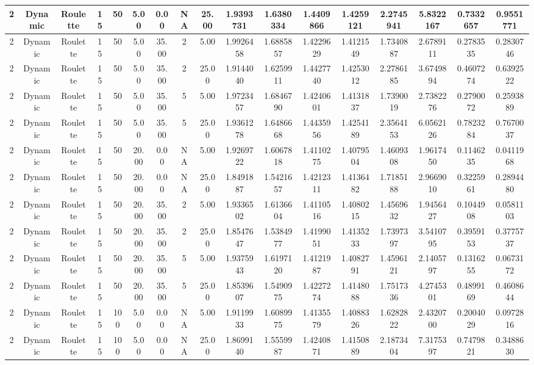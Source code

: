 \begin{longtable}{ | c | c | c | c | c | c | c | c | c | c | c | c | c | c | c | c | c | }
	\hline
	2	&	Dynamic	&	Roulette	&	15	&	50	&	5.00	&	0.00	&	NA	&	25.00	&	1.9393731	&	1.6380334	&	1.4409866	&	1.4259121	&	2.2745941	&	5.8322167	&	0.7332657	&	0.9551771 \\
	\hline
	2	&	Dynamic	&	Roulette	&	15	&	50	&	5.00	&	35.00	&	2	&	5.00	&	1.9926458	&	1.6885857	&	1.4229629	&	1.4121549	&	1.7340887	&	2.6789111	&	0.2783535	&	0.2830746 \\
	\hline
	2	&	Dynamic	&	Roulette	&	15	&	50	&	5.00	&	35.00	&	2	&	25.00	&	1.9144040	&	1.6259911	&	1.4427740	&	1.4253012	&	2.2786185	&	3.6749894	&	0.4607274	&	0.6392522 \\
	\hline
	2	&	Dynamic	&	Roulette	&	15	&	50	&	5.00	&	35.00	&	5	&	5.00	&	1.9723457	&	1.6846790	&	1.4240601	&	1.4131837	&	1.7390019	&	2.7382276	&	0.2790072	&	0.2593889 \\
	\hline
	2	&	Dynamic	&	Roulette	&	15	&	50	&	5.00	&	35.00	&	5	&	25.00	&	1.9361278	&	1.6486668	&	1.4435956	&	1.4254189	&	2.3564153	&	6.0562126	&	0.7823284	&	0.7670037 \\
	\hline
	2	&	Dynamic	&	Roulette	&	15	&	50	&	20.00	&	0.00	&	NA	&	5.00	&	1.9269722	&	1.6067818	&	1.4110275	&	1.4079504	&	1.4609308	&	1.9617450	&	0.1146235	&	0.0411968 \\
	\hline
	2	&	Dynamic	&	Roulette	&	15	&	50	&	20.00	&	0.00	&	NA	&	25.00	&	1.8491887	&	1.5421657	&	1.4212311	&	1.4136482	&	1.7185188	&	2.9669010	&	0.3225961	&	0.2894480 \\
	\hline
	2	&	Dynamic	&	Roulette	&	15	&	50	&	20.00	&	35.00	&	2	&	5.00	&	1.9336502	&	1.6136604	&	1.4110516	&	1.4080215	&	1.4569632	&	1.9456427	&	0.1044908	&	0.0581103 \\
	\hline
	2	&	Dynamic	&	Roulette	&	15	&	50	&	20.00	&	35.00	&	2	&	25.00	&	1.8547647	&	1.5384977	&	1.4199051	&	1.4135233	&	1.7397397	&	3.5410795	&	0.3959153	&	0.3775737 \\
	\hline
	2	&	Dynamic	&	Roulette	&	15	&	50	&	20.00	&	35.00	&	5	&	5.00	&	1.9375943	&	1.6197120	&	1.4121987	&	1.4082791	&	1.4596121	&	2.1405797	&	0.1316255	&	0.0673172 \\
	\hline
	2	&	Dynamic	&	Roulette	&	15	&	50	&	20.00	&	35.00	&	5	&	25.00	&	1.8539607	&	1.5490975	&	1.4227274	&	1.4148088	&	1.7517336	&	4.2745301	&	0.4899169	&	0.4608644 \\
	\hline
	2	&	Dynamic	&	Roulette	&	15	&	100	&	5.00	&	0.00	&	NA	&	5.00	&	1.9119933	&	1.6089975	&	1.4135579	&	1.4088326	&	1.6282822	&	2.4320700	&	0.2004029	&	0.0972816 \\
	\hline
	2	&	Dynamic	&	Roulette	&	15	&	100	&	5.00	&	0.00	&	NA	&	25.00	&	1.8699140	&	1.5559987	&	1.4240871	&	1.4150889	&	2.1873404	&	7.3175397	&	0.7479821	&	0.3488630 \\

\end{longtable}
